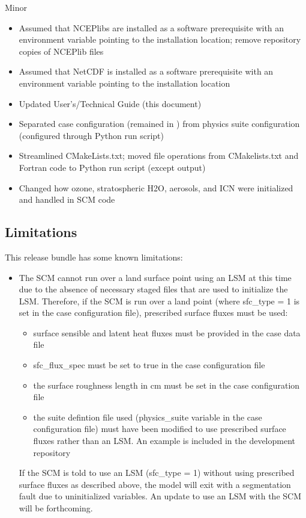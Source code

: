 Minor
\begin{itemize}
\item Assumed that NCEPlibs are installed as a software prerequisite with an environment variable pointing to the installation location; remove repository copies of NCEPlib files
\item Assumed that NetCDF is installed as a software prerequisite with an environment variable pointing to the installation location
\item Updated User's/Technical Guide (this document)
\item Separated case configuration (remained in ) from physics suite configuration (configured through Python run script)
\item Streamlined CMakeLists.txt; moved file operations from CMakelists.txt and Fortran code to Python run script (except output)
\item Changed how ozone, stratospheric H2O, aerosols, and ICN were initialized and handled in SCM code
\end{itemize}

\subsection{Limitations}

This release bundle has some known limitations:

\begin{itemize}
\item The SCM cannot run over a land surface point using an LSM at this time due to the absence of necessary staged files that are used to initialize the LSM. Therefore, if the SCM is run over a land point (where sfc\_type = 1 is set in the case configuration file), prescribed surface fluxes must be used:
\begin{itemize}
\item surface sensible and latent heat fluxes must be provided in the case data file
\item sfc\_flux\_spec must be set to true in the case configuration file
\item the surface roughness length in cm must be set in the case configuration file
\item the suite defintion file used (physics\_suite variable in the case configuration file) must have been modified to use prescribed surface fluxes rather than an LSM. An example is included in the development repository
\end{itemize}
If the SCM is told to use an LSM (sfc\_type = 1) without using prescribed surface fluxes as described above, the model will exit with a segmentation fault due to uninitialized variables. An update to use an LSM with the SCM will be forthcoming.
\end{itemize}

